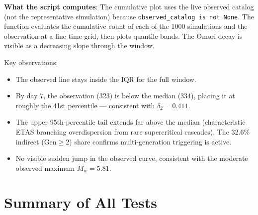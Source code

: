 \documentclass[12pt,a4paper]{article}
\begin{document}
\textbf{What the script computes}: The cumulative plot uses the live observed
catalog (not the representative simulation) because \texttt{observed\_catalog
is not None}. The function evaluates the cumulative count of each of the 1000
simulations and the observation at a fine time grid, then plots quantile bands.
The Omori decay is visible as a decreasing slope through the window.

Key observations:
\begin{itemize}
    \item The observed line stays inside the IQR for the full window.
    \item By day 7, the observation (323) is below the median (334), placing
          it at roughly the 41st percentile --- consistent with $\delta_2 = 0.411$.
    \item The upper 95th-percentile tail extends far above the median
          (characteristic ETAS branching overdispersion from rare
          supercritical cascades). The 32.6\% indirect ($\text{Gen} \geq 2$)
          share confirms multi-generation triggering is active.
    \item No visible sudden jump in the observed curve, consistent with the
          moderate observed maximum $M_w = 5.81$.
\end{itemize}

\section{Summary of All Tests}
\end{document}
